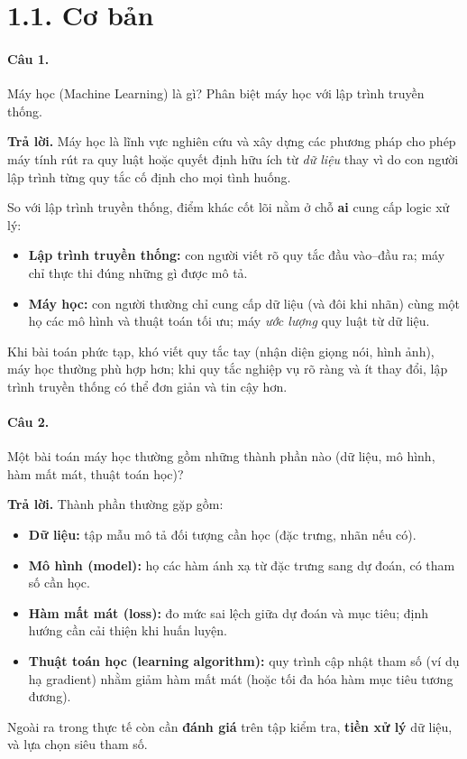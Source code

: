 \section*{1.1. Cơ bản}

\paragraph{Câu 1.} Máy học (Machine Learning) là gì? Phân biệt máy học với lập trình truyền thống.

\medskip\noindent\textbf{Trả lời.} Máy học là lĩnh vực nghiên cứu và xây dựng các phương pháp cho phép máy tính rút ra quy luật hoặc quyết định hữu ích từ \emph{dữ liệu} thay vì do con người lập trình từng quy tắc cố định cho mọi tình huống.

So với lập trình truyền thống, điểm khác cốt lõi nằm ở chỗ \textbf{ai} cung cấp logic xử lý:
\begin{itemize}[nosep]
\item \textbf{Lập trình truyền thống:} con người viết rõ quy tắc đầu vào--đầu ra; máy chỉ thực thi đúng những gì được mô tả.
\item \textbf{Máy học:} con người thường chỉ cung cấp dữ liệu (và đôi khi nhãn) cùng một họ các mô hình và thuật toán tối ưu; máy \emph{ước lượng} quy luật từ dữ liệu.
\end{itemize}
Khi bài toán phức tạp, khó viết quy tắc tay (nhận diện giọng nói, hình ảnh), máy học thường phù hợp hơn; khi quy tắc nghiệp vụ rõ ràng và ít thay đổi, lập trình truyền thống có thể đơn giản và tin cậy hơn.

\paragraph{Câu 2.} Một bài toán máy học thường gồm những thành phần nào (dữ liệu, mô hình, hàm mất mát, thuật toán học)?

\medskip\noindent\textbf{Trả lời.} Thành phần thường gặp gồm:
\begin{itemize}[nosep]
\item \textbf{Dữ liệu:} tập mẫu mô tả đối tượng cần học (đặc trưng, nhãn nếu có).
\item \textbf{Mô hình (model):} họ các hàm ánh xạ từ đặc trưng sang dự đoán, có tham số cần học.
\item \textbf{Hàm mất mát (loss):} đo mức sai lệch giữa dự đoán và mục tiêu; định hướng cần cải thiện khi huấn luyện.
\item \textbf{Thuật toán học (learning algorithm):} quy trình cập nhật tham số (ví dụ hạ gradient) nhằm giảm hàm mất mát (hoặc tối đa hóa hàm mục tiêu tương đương).
\end{itemize}
Ngoài ra trong thực tế còn cần \textbf{đánh giá} trên tập kiểm tra, \textbf{tiền xử lý} dữ liệu, và lựa chọn siêu tham số.

